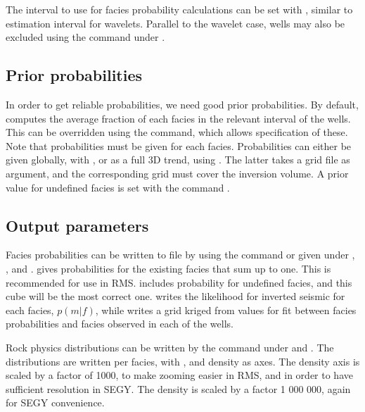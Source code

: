 
The interval to use for facies probability calculations can be
set with , similar to
estimation interval for wavelets. Parallel to the wavelet case, wells
may also be excluded using the 
command under .

\subsection{Prior probabilities}
In order to get reliable probabilities, we need good prior
probabilities. By default, \crava computes the average fraction of
each facies in the relevant interval of the wells. This can be
overridden using the  command, which
allows specification of these. Note that probabilities must be given
for each facies. Probabilities can either be given globally, with
, or as a full 3D trend, using
. The latter takes a grid file as argument,
and the corresponding grid must cover the inversion volume.
A prior value for
undefined facies is set with the command . 

\subsection{Output parameters}
Facies probabilities can be written to file by using the command
 or
given under , ,  
 and .  gives probabilities for
the existing facies that sum up to one. This is recommended for use in
RMS.  includes probability for
undefined facies, and this cube will be the most correct
one.  writes the
likelihood for inverted seismic for each facies, $p(m|f)$, while
 writes a grid
kriged from values for fit between facies probabilities and facies
observed in each of the wells. 

Rock physics distributions can be written by the command
under  and . The distributions are
written per facies, with \vp, \vs and density as
axes. The density axis is scaled by a factor of 1000, to make zooming easier in RMS, and in order to have sufficient resolution in SEGY. The density is scaled by a factor 1 000 000, again for SEGY convenience.


